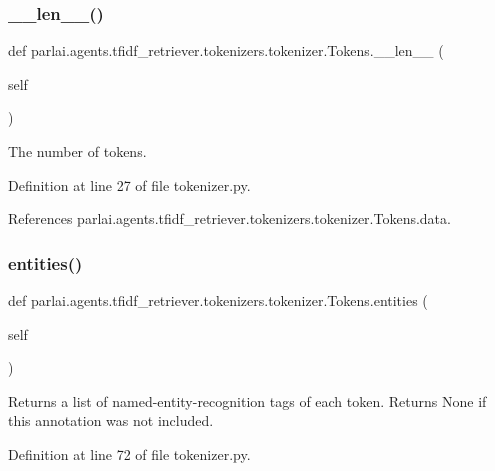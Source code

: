 \subsubsection{\texorpdfstring{\+\_\+\+\_\+len\+\_\+\+\_\+()}{\_\_len\_\_()}}
{\footnotesize\ttfamily def parlai.\+agents.\+tfidf\+\_\+retriever.\+tokenizers.\+tokenizer.\+Tokens.\+\_\+\+\_\+len\+\_\+\+\_\+ (\begin{DoxyParamCaption}\item[{}]{self }\end{DoxyParamCaption})}

\begin{DoxyVerb}The number of tokens.\end{DoxyVerb}
 

Definition at line 27 of file tokenizer.\+py.



References parlai.\+agents.\+tfidf\+\_\+retriever.\+tokenizers.\+tokenizer.\+Tokens.\+data.

\mbox{\label{classparlai_1_1agents_1_1tfidf__retriever_1_1tokenizers_1_1tokenizer_1_1Tokens_ab5d74ebfda5597b48f1ddc5f607292de}} 
\subsubsection{\texorpdfstring{entities()}{entities()}}
{\footnotesize\ttfamily def parlai.\+agents.\+tfidf\+\_\+retriever.\+tokenizers.\+tokenizer.\+Tokens.\+entities (\begin{DoxyParamCaption}\item[{}]{self }\end{DoxyParamCaption})}

\begin{DoxyVerb}Returns a list of named-entity-recognition tags of each token.
Returns None if this annotation was not included.
\end{DoxyVerb}
 

Definition at line 72 of file tokenizer.\+py.



